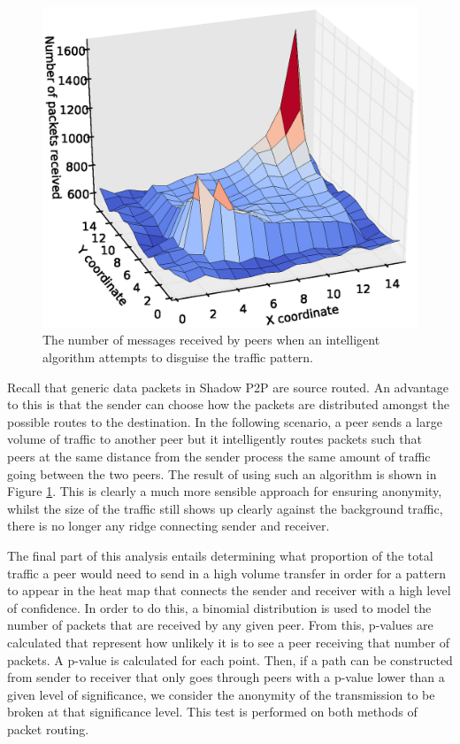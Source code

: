 \documentclass[ %
                    author={Luke Murray},
                supervisor={Dr. Simon Hollis},
                     title={Shadow Peer-to-Peer Networks},
                  subtitle={},
                    degree={MEng},
                      year={2013} ]{thesis}
\begin{document}
\begin{figure}[h]
    \centering
    \begin{minipage}[b]{0.8\linewidth}
        \centering
        \includegraphics{diagrams/heat_map_clever.eps}
    \caption{The number of messages received by peers when an intelligent algorithm attempts to disguise the traffic pattern.}
    \end{minipage}
    \label{heatmap_clever}
\end{figure}

Recall that generic data packets in Shadow P2P are source routed. An advantage to this is that the sender can choose how the packets are distributed amongst the possible routes to the destination. In the following scenario, a peer sends a large volume of traffic to another peer but it intelligently routes packets such that peers at the same distance from the sender process the same amount of traffic going between the two peers. The result of using such an algorithm is shown in Figure \ref{heatmap_clever}. This is clearly a much more sensible approach for ensuring anonymity, whilst the size of the traffic still shows up clearly against the background traffic, there is no longer any ridge connecting sender and receiver.

The final part of this analysis entails determining what proportion of the total traffic a peer would need to send in a high volume transfer in order for a pattern to appear in the heat map that connects the sender and receiver with a high level of confidence. In order to do this, a binomial distribution is used to model the number of packets that are received by any given peer. From this, p-values are calculated that represent how unlikely it is to see a peer receiving that number of packets. A p-value is calculated for each point. Then, if a path can be constructed from sender to receiver that only goes through peers with a p-value lower than a given level of significance, we consider the anonymity of the transmission to be broken at that significance level. This test is performed on both methods of packet routing.
\end{document}
